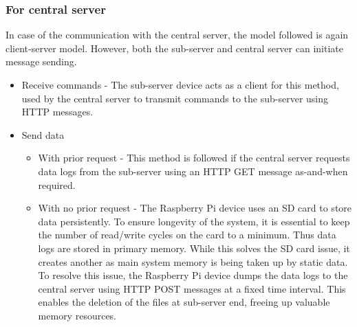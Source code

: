 \documentclass[letterpaper,11pt]{report}
\begin{document}
\subsubsection{For central server}
In case of the communication with the central server, the model followed is again client-server model. However, both the sub-server and central server can initiate message sending.
\begin{itemize}
    \item Receive commands - The sub-server device acts as a client for this method, used by the central server to transmit commands to the sub-server using HTTP messages.
    \item Send data
    \begin{itemize}
        \item With prior request - This method is followed if the central server requests data logs from the sub-server using an HTTP GET message as-and-when required.
        \item With no prior request - The Raspberry Pi device uses an SD card to store data persistently. To ensure longevity of the system, it is essential to keep the number of read/write cycles on the card to a minimum. Thus data logs are stored in primary memory. While this solves the SD card issue, it creates another as main system memory is being taken up by static data. To resolve this issue, the Raspberry Pi device dumps the data logs to the central server using HTTP POST messages at a fixed time interval. This enables the deletion of the files at sub-server end, freeing up valuable memory resources.
    \end{itemize}
\end{itemize}

%

%
%


\end{document}
